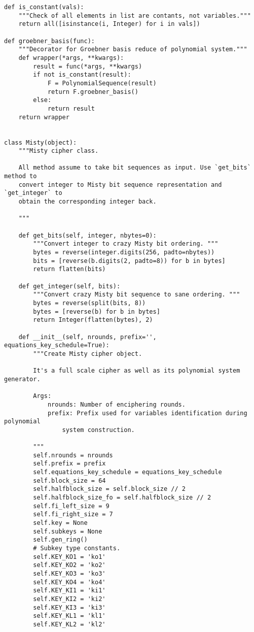 \begin{lstlisting}
def is_constant(vals):
    """Check of all elements in list are contants, not variables."""
    return all([isinstance(i, Integer) for i in vals])

def groebner_basis(func):
    """Decorator for Groebner basis reduce of polynomial system."""
    def wrapper(*args, **kwargs):
        result = func(*args, **kwargs)
        if not is_constant(result):
            F = PolynomialSequence(result)
            return F.groebner_basis()
        else:
            return result
    return wrapper


class Misty(object):
    """Misty cipher class.

    All method assume to take bit sequences as input. Use `get_bits` method to
    convert integer to Misty bit sequence representation and `get_integer` to
    obtain the corresponding integer back.

    """

    def get_bits(self, integer, nbytes=0):
        """Convert integer to crazy Misty bit ordering. """
        bytes = reverse(integer.digits(256, padto=nbytes))
        bits = [reverse(b.digits(2, padto=8)) for b in bytes]
        return flatten(bits)

    def get_integer(self, bits):
        """Convert crazy Misty bit sequence to sane ordering. """
        bytes = reverse(split(bits, 8))
        bytes = [reverse(b) for b in bytes]
        return Integer(flatten(bytes), 2)

    def __init__(self, nrounds, prefix='', equations_key_schedule=True):
        """Create Misty cipher object.

        It's a full scale cipher as well as its polynomial system generator.

        Args:
            nrounds: Number of enciphering rounds.
            prefix: Prefix used for variables identification during polynomial
                system construction.

        """
        self.nrounds = nrounds
        self.prefix = prefix
        self.equations_key_schedule = equations_key_schedule
        self.block_size = 64
        self.halfblock_size = self.block_size // 2
        self.halfblock_size_fo = self.halfblock_size // 2
        self.fi_left_size = 9
        self.fi_right_size = 7
        self.key = None
        self.subkeys = None
        self.gen_ring()
        # Subkey type constants.
        self.KEY_KO1 = 'ko1'
        self.KEY_KO2 = 'ko2'
        self.KEY_KO3 = 'ko3'
        self.KEY_KO4 = 'ko4'
        self.KEY_KI1 = 'ki1'
        self.KEY_KI2 = 'ki2'
        self.KEY_KI3 = 'ki3'
        self.KEY_KL1 = 'kl1'
        self.KEY_KL2 = 'kl2'


\end{lstlisting}
